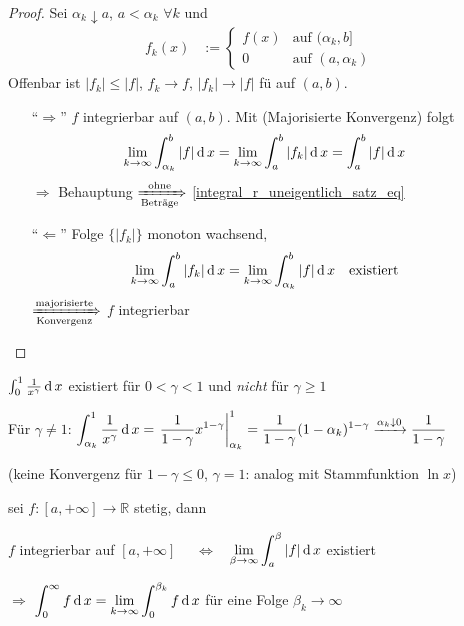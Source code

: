 \begin{proof}
	Sei $\alpha_k\downarrow a$, $a < \alpha_k$ $\forall k$ und \begin{align*}
		f_k(x) &:= \begin{cases}
			f(x) & \text{auf $(\alpha_k, b]$} \\
			0 & \text{auf $(a, \alpha_k)$}
		\end{cases}
	\end{align*}
	Offenbar ist $\vert f_k\vert \le \vert f\vert$, $f_k\to f$, $\vert f_k\vert \to \vert f \vert$ \gls{fü} auf $(a,b)$.
	\begin{itemize}
		\item["`$\Rightarrow$"'] $f$ integrierbar auf $(a,b)$. Mit  (Majorisierte Konvergenz) folgt \begin{align*}
		\lim\limits_{k\to\infty} \int_{\alpha_k}^b \vert f \vert \operatorname{d} x &= \lim\limits_{k\to\infty} \int_a^b \vert f_k\vert \operatorname{d} x = \int_a^b \vert f \vert \operatorname{d} x
		\end{align*}
		$\Rightarrow$ Behauptung $\xRightarrow[\text{Beträge}]{\text{ohne}}$ \eqref{integral_r_uneigentlich_satz_eq}
		
		\item["`$\Leftarrow$"'] Folge $\{ \vert f_k\vert \}$ monoton wachsend, \begin{align*}
			\lim\limits_{k\to\infty} \int_a^b \vert f_k\vert \operatorname{d} x &= \lim\limits_{k\to\infty} \int_{\alpha_k}^b \vert f \vert \operatorname{d} x\quad\text{existiert}
		\end{align*}
		$\xRightarrow[\text{Konvergenz}]{\text{majorisierte}}$ $f$ integrierbar
	\end{itemize}
\end{proof}

\begin{example}
	$\int_0^1 \frac{1}{x^\gamma} \operatorname{d} x$ existiert für $0 < \gamma < 1$ und \emph{nicht} für $\gamma \ge 1$
	
	Für $\gamma \neq 1$: $\displaystyle \int_{\alpha_k}^1 \frac{1}{x^\gamma} \operatorname{d} x = \left.\frac{1}{1 - \gamma}x^{1 - \gamma}\right|_{\alpha_k}^1 = \frac{1}{1-\gamma} (1 - \alpha_k)^{1 - \gamma} \xrightarrow{\alpha_k \downarrow 0} \frac{1}{1 - \gamma}$
	
	(keine Konvergenz für $1 - \gamma \le 0$, $\gamma=1$: analog mit Stammfunktion $\ln x$)
\end{example}

\begin{proposition}
	sei $f:[a,+\infty]\to\mathbb{R}$ stetig, dann \begin{center}
		$f$ integrierbar auf $[a,+\infty]$ \ \ $\Leftrightarrow$ \ $\displaystyle \lim\limits_{\beta \to \infty}  \int_a^\beta \vert f \vert \operatorname{d} x$ existiert
	\end{center}
	$\Rightarrow$ $\displaystyle \int_0^\infty f \operatorname{d} x = \lim\limits_{k\to\infty} \int_0^{\beta_k} f \operatorname{d} x$ für eine Folge $\beta_k\to\infty$
\end{proposition}

